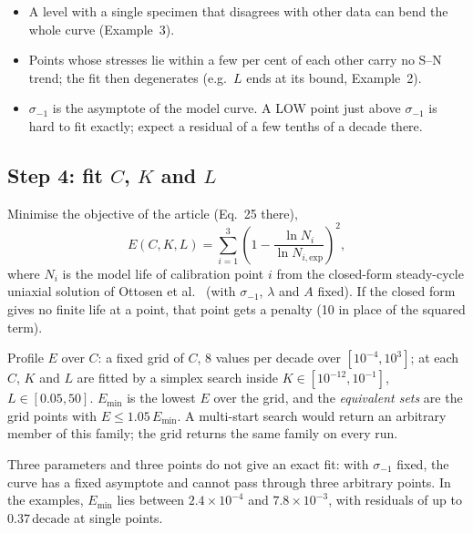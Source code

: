 \documentclass[11pt,a4paper]{article}
\newcommand{\sigm}{\sigma_{-1}}
\newcommand{\Emin}{E_{\min}}
\newcommand{\dec}{\,\text{decade}}
\begin{document}
\begin{pitfall}
\begin{itemize}[leftmargin=*]
\item A level with a single specimen that disagrees with other data can bend the whole curve (Example~3).
\item Points whose stresses lie within a few per cent of each other carry no S--N trend; the fit then degenerates
  (e.g.\ $L$ ends at its bound, Example~2).
\item $\sigm$ is the asymptote of the model curve. A LOW point just above $\sigm$ is hard to fit exactly; expect a
  residual of a few tenths of a decade there.
\end{itemize}
\end{pitfall}

\FloatBarrier
\subsection*{Step 4: fit $C$, $K$ and $L$}
Minimise the objective of the article (Eq.~25 there),
\begin{equation}
  E(C,K,L) = \sum_{i=1}^{3}\left(1-\frac{\ln N_i}{\ln N_{i,\text{exp}}}\right)^{2},
  \label{eq:E}
\end{equation}
where $N_i$ is the model life of calibration point $i$ from the closed-form steady-cycle uniaxial solution of Ottosen
et al.~\cite{ottosen2008} (with $\sigm$, $\lambda$ and $A$ fixed). If the closed form gives no finite life at a
point, that point gets a penalty (10 in place of the squared term).

\begin{rulebox}
Profile $E$ over $C$: a fixed grid of $C$, 8 values per decade over $[10^{-4},10^{3}]$; at each $C$, $K$ and $L$ are
fitted by a simplex search inside $K\in[10^{-12},10^{-1}]$, $L\in[0.05,50]$. $\Emin$ is the lowest $E$ over the grid,
and the \emph{equivalent sets} are the grid points with $E\le 1.05\,\Emin$. A multi-start search would return an
arbitrary member of this family; the grid returns the same family on every run.
\end{rulebox}

Three parameters and three points do not give an exact fit: with $\sigm$ fixed, the curve has a fixed asymptote and
cannot pass through three arbitrary points. In the examples, $\Emin$ lies between $2.4\times10^{-4}$ and
$7.8\times10^{-3}$, with residuals of up to $0.37\dec$ at single points.

\FloatBarrier
\end{document}
